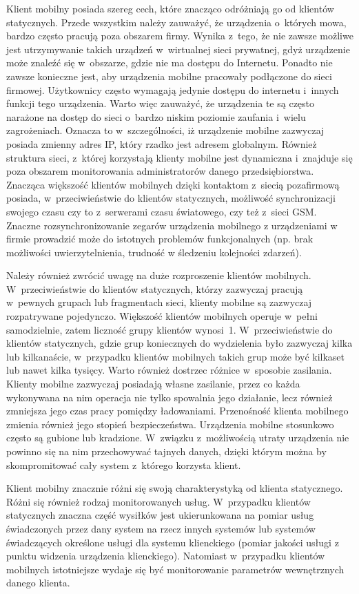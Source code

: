 Klient mobilny posiada szereg cech, które znacząco odróżniają go od
klientów statycznych. Przede wszystkim należy zauważyć, że urządzenia
o~których mowa, bardzo często pracują poza obszarem firmy. Wynika
z~tego, że nie zawsze możliwe jest utrzymywanie takich urządzeń
w~wirtualnej sieci prywatnej, gdyż urządzenie może znaleźć się
w~obszarze, gdzie nie ma dostępu do Internetu. Ponadto nie zawsze
konieczne jest, aby urządzenia mobilne pracowały podłączone do sieci
firmowej. Użytkownicy często wymagają jedynie dostępu do internetu
i~innych funkcji tego urządzenia. Warto więc zauważyć, że urządzenia
te są często narażone na dostęp do sieci o~bardzo niskim poziomie
zaufania i~wielu zagrożeniach. Oznacza to w~szczególności, iż
urządzenie mobilne zazwyczaj posiada zmienny adres IP, który rzadko
jest adresem globalnym. Również struktura sieci, z~której korzystają
klienty mobilne jest dynamiczna i~znajduje się poza obszarem
monitorowania administratorów danego przedsiębiorstwa. Znacząca
większość klientów mobilnych dzięki kontaktom z~siecią pozafirmową
posiada, w~przeciwieństwie do klientów statycznych, możliwość
synchronizacji swojego czasu czy to z~serwerami czasu światowego, czy
też z~sieci GSM. Znaczne rozsynchronizowanie zegarów urządzenia
mobilnego z urządzeniami w firmie prowadzić może do istotnych
problemów funkcjonalnych (np. brak możliwości uwierzytelnienia,
trudność w śledzeniu kolejności zdarzeń). 

Należy również zwrócić uwagę na duże rozproszenie klientów
mobilnych. W~przeciwieństwie do klientów statycznych, którzy zazwyczaj
pracują w~pewnych grupach lub fragmentach sieci, klienty mobilne są
zazwyczaj rozpatrywane pojedynczo. Większość klientów mobilnych
operuje w~pełni samodzielnie, zatem liczność grupy klientów
wynosi~1. W~przeciwieństwie do klientów statycznych, gdzie grup
koniecznych do wydzielenia było zazwyczaj kilka lub kilkanaście,
w~przypadku klientów mobilnych takich grup może być kilkaset lub nawet
kilka tysięcy. Warto również dostrzec różnice w~sposobie
zasilania. Klienty mobilne zazwyczaj posiadają własne zasilanie, przez
co każda wykonywana na nim operacja nie tylko spowalnia jego
działanie, lecz również zmniejsza jego czas pracy pomiędzy
ładowaniami. Przenośność klienta mobilnego zmienia również jego
stopień bezpieczeństwa. Urządzenia mobilne stosunkowo często są
gubione lub kradzione. W~związku z~możliwością utraty urządzenia nie
powinno się na nim przechowywać tajnych danych, dzięki którym można by
skompromitować cały system z~którego korzysta klient.

Klient mobilny znacznie różni się swoją charakterystyką od klienta
statycznego. Różni się również rodzaj monitorowanych
usług. W~przypadku klientów statycznych znaczna część wysiłków jest
ukierunkowana na pomiar usług świadczonych przez dany system na rzecz
innych systemów lub systemów świadczących określone usługi dla systemu
klienckiego (pomiar jakości usługi z punktu widzenia urządzenia
klienckiego). Natomiast w~przypadku klientów mobilnych istotniejsze
wydaje się być monitorowanie parametrów wewnętrznych danego klienta.

